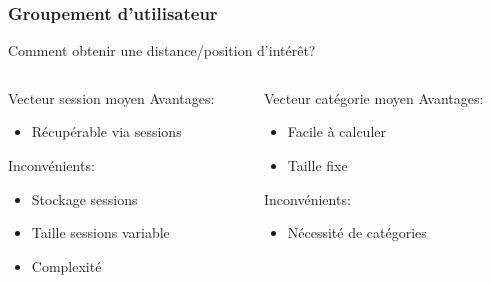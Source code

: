 \documentclass{beamer}
\begin{document}
            \begin{frame}
                \frametitle{Groupement d'utilisateur}
                Comment obtenir une distance/position d'intérêt?
                \pause
                \begin{columns}
                    \begin{column}{4cm}
                        \begin{block}{Vecteur session moyen}
                            \pause
                            Avantages:
                            \begin{itemize}
                                \pause
                                \item Récupérable via sessions
                            \end{itemize}
                            \pause
                            Inconvénients:
                            \begin{itemize}
                                \pause
                                \item Stockage sessions
                                \pause
                                \item Taille sessions variable
                                \pause
                                \item Complexité
                            \end{itemize}
                        \end{block}
                    \end{column}
                    \pause
                    \begin{column}{4cm}
                        \begin{block}{Vecteur catégorie moyen}
                            \pause
                            Avantages:
                            \begin{itemize}
                                \pause
                                \item Facile à calculer
                                \pause
                                \item Taille fixe
                            \end{itemize}
                            \pause
                            Inconvénients:
                            \begin{itemize}
                                \pause
                                \item Nécessité de catégories
                            \end{itemize}
                        \end{block}
                    \end{column}
                \end{columns}
            \end{frame}
\end{document}
